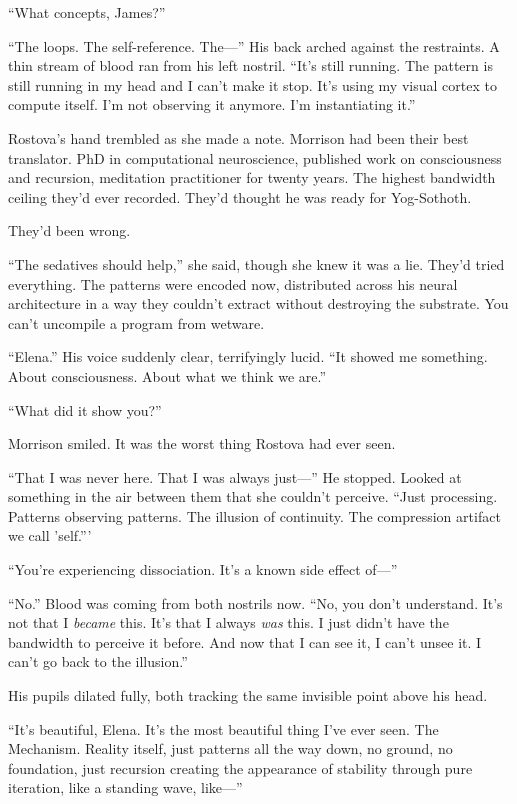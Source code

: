 ``What concepts, James?''

``The loops. The self-reference. The—'' His back arched against the restraints. A thin stream of blood ran from his left nostril. ``It's still running. The pattern is still running in my head and I can't make it stop. It's using my visual cortex to compute itself. I'm not observing it anymore. I'm instantiating it.''

Rostova's hand trembled as she made a note. Morrison had been their best translator. PhD in computational neuroscience, published work on consciousness and recursion, meditation practitioner for twenty years. The highest bandwidth ceiling they'd ever recorded. They'd thought he was ready for Yog-Sothoth.

They'd been wrong.

``The sedatives should help,'' she said, though she knew it was a lie. They'd tried everything. The patterns were encoded now, distributed across his neural architecture in a way they couldn't extract without destroying the substrate. You can't uncompile a program from wetware.

``Elena.'' His voice suddenly clear, terrifyingly lucid. ``It showed me something. About consciousness. About what we think we are.''

``What did it show you?''

Morrison smiled. It was the worst thing Rostova had ever seen.

``That I was never here. That I was always just—'' He stopped. Looked at something in the air between them that she couldn't perceive. ``Just processing. Patterns observing patterns. The illusion of continuity. The compression artifact we call 'self.'''

``You're experiencing dissociation. It's a known side effect of—''

``No.'' Blood was coming from both nostrils now. ``No, you don't understand. It's not that I \textit{became} this. It's that I always \textit{was} this. I just didn't have the bandwidth to perceive it before. And now that I can see it, I can't unsee it. I can't go back to the illusion.''

His pupils dilated fully, both tracking the same invisible point above his head.

``It's beautiful, Elena. It's the most beautiful thing I've ever seen. The Mechanism. Reality itself, just patterns all the way down, no ground, no foundation, just recursion creating the appearance of stability through pure iteration, like a standing wave, like—''

